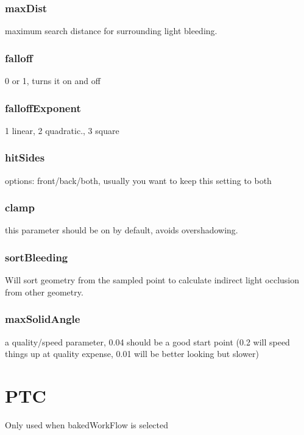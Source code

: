\documentclass[final,letterpaper,twoside,12pt]{report}
\begin{document}
\subsubsection {maxDist}
maximum search distance for surrounding light bleeding.
\smallskip
\subsubsection {falloff}
0 or 1, turns it on and off
\smallskip
\subsubsection {falloffExponent}
1 linear, 2 quadratic., 3 square
\smallskip
\subsubsection {hitSides}
options: front/back/both, usually you want to keep this setting to both
\smallskip
\subsubsection {clamp}
this parameter should be on by default, avoids overshadowing.
\smallskip
\subsubsection {sortBleeding}
Will sort geometry from the sampled point to calculate indirect light occlusion from other geometry.
\smallskip
\subsubsection {maxSolidAngle}
a quality/speed parameter, 0.04 should be a good start point (0.2 will speed things up at quality expense, 0.01 will be better looking but slower)
\smallskip



\section {PTC}
Only used when bakedWorkFlow is selected
\end{document}
